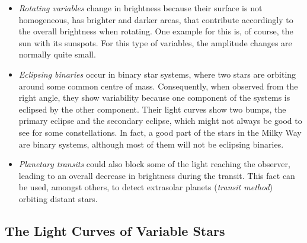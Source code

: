 \begin{itemize}
\item \emph{Rotating variables} change in brightness because their surface is not homogeneous, \eg has brighter and darker areas, that contribute accordingly to the overall brightness when rotating. One example for this is, of course, the sun with its sunspots. For this type of variables, the amplitude changes are normally quite small.
\item \emph{Eclipsing binaries} occur in binary star systems, where two stars are orbiting around some common centre of mass. Consequently, when observed from the right angle, they show variability because one component of the systems is eclipsed by the other component. Their light curves show two bumps, the primary eclipse and the secondary eclipse, which might not always be good to see for some constellations. In fact, a good part of the stars in the Milky Way are binary systems, although most of them will not be eclipsing binaries.

\item \emph{Planetary transits} could also block some of the light reaching the observer, leading to an overall decrease in brightness during the transit. This fact can be used, amongst others, to detect extrasolar planets (\emph{transit method}) orbiting distant stars.
\end{itemize}

\subsection{The Light Curves of Variable Stars}
\label{subsec:light-curves-variables}

